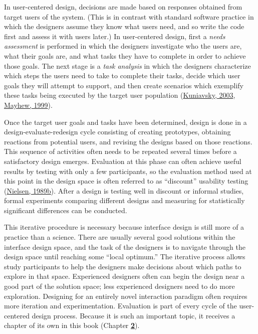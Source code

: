 \documentclass[sigconf,nonacm,screen,pbalance]{acmart}
\begin{document}
In user-centered design, decisions are made based on responses obtained from target users of the system.
(This is in contrast with standard software practice in which the designers assume they know what users
need, and so write the code first and assess it with users later.) In user-centered design, first a {\em 
needs assessment} is performed in which the designers investigate who the users are, what their goals
are, and what tasks they have to complete in order to achieve those goals. The next stage is a {\em  task
analysis} in which the designers characterize which steps the users need to take to complete their
tasks, decide which user goals they will attempt to support, and then create scenarios which exemplify
these tasks being executed by the target user population (\href{https://searchuserinterfaces.com/book/sui_references.html#kuniavsky2003oue}{Kuniavsky, 2003}, \href{https://searchuserinterfaces.com/book/sui_references.html#mayhew1999uel}{ Mayhew, 1999}).

Once the target user goals and tasks have been determined, design is done in a design-evaluate-redesign
cycle consisting of creating prototypes, obtaining reactions from potential users, and revising the
designs based on those reactions. This sequence of activities often needs to be repeated several times
before a satisfactory design emerges. Evaluation at this phase can often achieve useful results by testing
with only a few participants, so the evaluation method used at this point in the design space is often
referred to as ``discount'' usability testing (\href{https://searchuserinterfaces.com/book/sui_references.html#nielsen1989ued}{Nielsen, 1989b}).
After a design is testing well in discount or informal studies, formal experiments
comparing different designs and measuring for statistically significant differences can be conducted.

This iterative procedure is necessary because interface design is still more of a practice than a science.
There are usually several good solutions within the interface design space, and the task of the designers
is to navigate through the design space until reaching some ``local optimum.'' The iterative process allows
study participants to help the designers make decisions about which paths to explore in that space.
Experienced designers often can begin the design near a good part of the solution space; less experienced
designers need to do more exploration. Designing for an entirely novel interaction paradigm often requires
more iteration and experimentation. Evaluation is part of every cycle of the user-centered design process.
Because it is such an important topic, it receives a chapter of its own in this book (Chapter \href{https://searchuserinterfaces.com/book/sui_ch2_evaluation.html}{{\bf 2}}).
\end{document}
